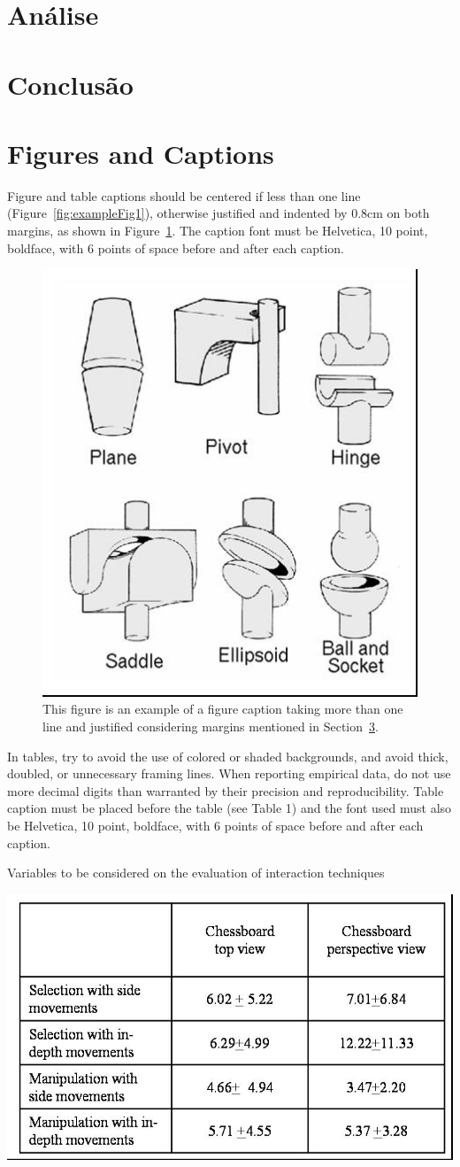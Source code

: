 \documentclass[12pt]{article}
\begin{document}
\section{Análise}
\section{Conclusão}

\section{Figures and Captions}\label{sec:figs}


Figure and table captions should be centered if less than one line
(Figure~\ref{fig:exampleFig1}), otherwise justified and indented by 0.8cm on
both margins, as shown in Figure~\ref{fig:exampleFig2}. The caption font must
be Helvetica, 10 point, boldface, with 6 points of space before and after each
caption.

\begin{figure}[ht]
\centering
\includegraphics[width=.3\textwidth]{fig2.jpg}
\caption{This figure is an example of a figure caption taking more than one
  line and justified considering margins mentioned in Section~\ref{sec:figs}.}
\label{fig:exampleFig2}
\end{figure}

In tables, try to avoid the use of colored or shaded backgrounds, and avoid
thick, doubled, or unnecessary framing lines. When reporting empirical data,
do not use more decimal digits than warranted by their precision and
reproducibility. Table caption must be placed before the table (see Table 1)
and the font used must also be Helvetica, 10 point, boldface, with 6 points of
space before and after each caption.

\begin{table}[ht]
\centering
\caption{Variables to be considered on the evaluation of interaction
  techniques}
\label{tab:exTable1}
\includegraphics[width=.7\textwidth]{table.jpg}
\end{table}
\end{document}

